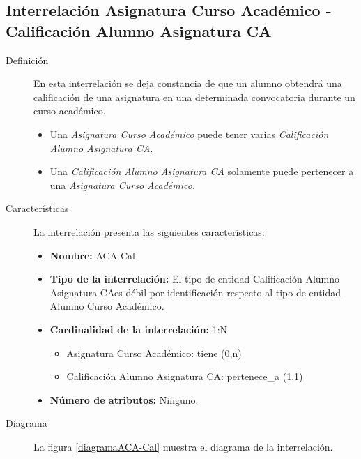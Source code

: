 \subsection{Interrelación Asignatura Curso Académico - Calificación Alumno
            Asignatura CA}

   \begin{description}
      \item[Definición] En esta interrelación se deja constancia de que un
      alumno obtendrá una calificación de una asignatura en una determinada
      convocatoria durante un curso académico.

      \begin{itemize}
       \item Una \textit{Asignatura Curso Académico} puede tener varias
             \textit{Calificación Alumno Asignatura CA}.
       \item Una \textit{Calificación Alumno Asignatura CA} solamente puede
             pertenecer a una \textit{Asignatura Curso Académico}.
      \end{itemize}

      \item[Características] La interrelación presenta las siguientes
                             características:

         \begin{itemize}
            \item \textbf{Nombre:} ACA-Cal
            \item \textbf{Tipo de la interrelación:} El tipo de entidad
                  Calificación Alumno Asignatura CAes débil por identificación
                  respecto al tipo de entidad Alumno Curso Académico.
            \item \textbf{Cardinalidad de la interrelación:} 1:N
                  \begin{itemize}
                     \item Asignatura Curso Académico: tiene (0,n)
                     \item Calificación Alumno Asignatura CA: pertenece\_a (1,1)
                  \end{itemize}
            \item \textbf{Número de atributos:} Ninguno.
         \end{itemize}

      \item[Diagrama] La figura \ref{diagramaACA-Cal} muestra el diagrama de la
                      interrelación.


\end{description}
